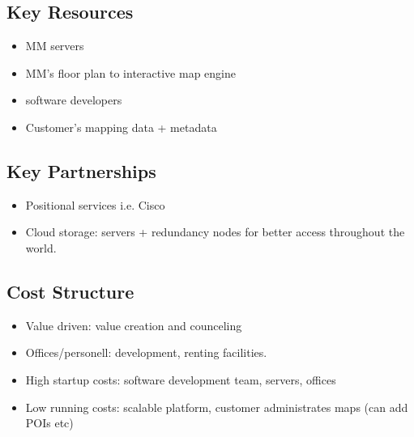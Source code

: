 \subsection{Key Resources}
\begin{itemize}
    \item MM servers
    \item MM's floor plan to interactive map engine
    \item software developers
    \item Customer's mapping data + metadata
\end{itemize}

\subsection{Key Partnerships}
\begin{itemize}
    \item Positional services i.e. Cisco
    \item Cloud storage: servers + redundancy nodes for better access throughout the world.
\end{itemize}

\subsection{Cost Structure}
\begin{itemize}
    \item Value driven: value creation and counceling
    \item Offices/personell: development, renting facilities.
    \item High startup costs: software development team, servers, offices
    \item Low running costs: scalable platform, customer administrates maps (can add POIs etc)
\end{itemize}